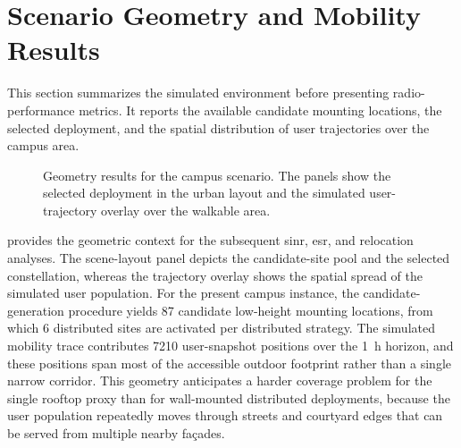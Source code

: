 \section{Scenario Geometry and Mobility Results}
\label{sec:results_geometry}

This section summarizes the simulated environment before presenting radio-performance metrics. It reports the available candidate mounting locations, the selected deployment, and the spatial distribution of user trajectories over the campus area.

\begin{figure}[t]
    \centering

    \caption{Geometry results for the campus scenario. The panels show the selected deployment in the urban layout and the simulated user-trajectory overlay over the walkable area.}
    \label{fig:geometry_pair}
\end{figure}

 provides the geometric context for the subsequent \gls{sinr}, \gls{esr}, and relocation analyses. The scene-layout panel depicts the candidate-site pool and the selected constellation, whereas the trajectory overlay shows the spatial spread of the simulated user population.
For the present campus instance, the candidate-generation procedure yields \num{87} candidate low-height mounting locations, from which \num{6} distributed sites are activated per distributed strategy. The simulated mobility trace contributes \num{7210} user-snapshot positions over the \SI{1}{\hour} horizon, and these positions span most of the accessible outdoor footprint rather than a single narrow corridor. This geometry anticipates a harder coverage problem for the single rooftop proxy than for wall-mounted distributed deployments, because the user population repeatedly moves through streets and courtyard edges that can be served from multiple nearby façades.
